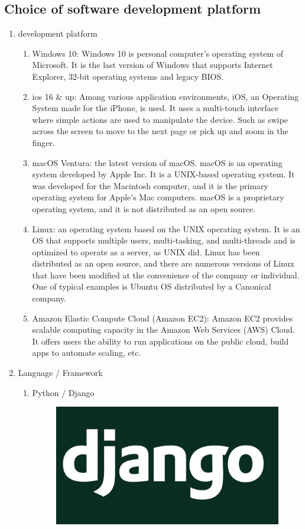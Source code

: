 \documentclass[conference]{IEEEtran}
\begin{document}
\subsection{Choice of software development platform}
\begin{enumerate}
    \item development platform
    \begin{enumerate}
        \item Windows 10:
        Windows 10 is personal computer’s operating system of Microsoft. It is the last version of Windows that supports Internet Explorer, 32-bit operating systems and legacy BIOS.
        \item ios 16 \& up:
        Among various application environments, iOS, an Operating System made for the iPhone, is used. It uses a multi-touch interface where simple actions are used to manipulate the device. Such as swipe across the screen to move to the next page or pick up and zoom in the finger.
        \item macOS Ventura:
        the latest version of macOS. macOS is an operating system developed by Apple Inc. It is a UNIX-based operating system. It was developed for the Macintosh computer, and it is the primary operating system for Apple's Mac computers. macOS is a proprietary operating system, and it is not distributed as an open source.
        \item Linux:
        an operating system based on the UNIX operating system. It is an OS that supports multiple users, multi-tasking, and multi-threads and is optimized to operate as a server, as UNIX did. Linux has been distributed as an open source, and there are numerous versions of Linux that have been modified at the convenience of the company or individual. One of typical examples is Ubuntu OS distributed by a Canonical company.
        \item Amazon Elastic Compute Cloud (Amazon EC2):
        Amazon EC2 provides scalable computing capacity in the Amazon Web Services (AWS) Cloud. It offers users the ability to run applications on the public cloud, build apps to automate scaling, etc.
    \end{enumerate}
    \item Language / Framework
    \begin{enumerate}
        \item Python / Django\\
        \begin{figure}[H]
                 \centering
                 \includegraphics[scale=0.1]{new_assets/django-logo.png}

\end{figure}
\end{enumerate}
\end{enumerate}
\end{document}
